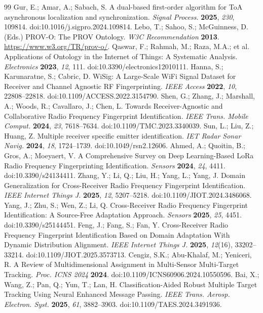 \begin{thebibliography}{99}
 Gur, E.; Amar, A.; Sabach, S. A dual-based first-order algorithm for ToA asynchronous localization and synchronization. \emph{Signal Process.} \textbf{2025}, \emph{230}, 109814. doi:10.1016/j.sigpro.2024.109814.
 Lebo, T.; Sahoo, S.; McGuinness, D. (Eds.) PROV-O: The PROV Ontology. \emph{W3C Recommendation} \textbf{2013}. \url{https://www.w3.org/TR/prov-o/}.
 Qaswar, F.; Rahmah, M.; Raza, M.A.; et al. Applications of Ontology in the Internet of Things: A Systematic Analysis. \emph{Electronics} \textbf{2023}, \emph{12}, 111. doi:10.3390/electronics12010111.
 Hanna, S.; Karunaratne, S.; Cabric, D. WiSig: A Large-Scale WiFi Signal Dataset for Receiver and Channel Agnostic RF Fingerprinting. \emph{IEEE Access} \textbf{2022}, \emph{10}, 22808--22818. doi:10.1109/ACCESS.2022.3154790.
 Shen, G.; Zhang, J.; Marshall, A.; Woods, R.; Cavallaro, J.; Chen, L. Towards Receiver-Agnostic and Collaborative Radio Frequency Fingerprint Identification. \emph{IEEE Trans. Mobile Comput.} \textbf{2024}, \emph{23}, 7618--7634. doi:10.1109/TMC.2023.3340039.
 Sun, L.; Liu, Z.; Huang, Z. Multiple receiver specific emitter identification. \emph{IET Radar Sonar Navig.} \textbf{2024}, \emph{18}, 1724--1739. doi:10.1049/rsn2.12606.
 Ahmed, A.; Quoitin, B.; Gros, A.; Moeyaert, V. A Comprehensive Survey on Deep Learning-Based LoRa Radio Frequency Fingerprinting Identification. \emph{Sensors} \textbf{2024}, \emph{24}, 4411. doi:10.3390/s24134411.
 Zhang, Y.; Li, Q.; Liu, H.; Yang, L.; Yang, J. Domain Generalization for Cross-Receiver Radio Frequency Fingerprint Identification. \emph{IEEE Internet Things J.} \textbf{2025}, \emph{12}, 5207--5218. doi:10.1109/JIOT.2024.3486068.
 Yang, J.; Zhu, S.; Wen, Z.; Li, Q. Cross-Receiver Radio Frequency Fingerprint Identification: A Source-Free Adaptation Approach. \emph{Sensors} \textbf{2025}, \emph{25}, 4451. doi:10.3390/s25144451.
 Feng, J.; Fang, S.; Fan, Y. Cross-Receiver Radio Frequency Fingerprint Identification Based on Domain Adaptation With Dynamic Distribution Alignment. \emph{IEEE Internet Things J.} \textbf{2025}, \emph{12}(16), 33202--33214. doi:10.1109/JIOT.2025.3573713.
 Cengiz, S.K.; Abu-Khalaf, M.; Yeniceri, R. A Review of Multidimensional Assignment in Multi-Sensor Multi-Target Tracking. \emph{Proc. ICNS 2024} \textbf{2024}. doi:10.1109/ICNS60906.2024.10550596.
 Bai, X.; Wang, Z.; Pan, Q.; Yun, T.; Lan, H. Classification-Aided Robust Multiple Target Tracking Using Neural Enhanced Message Passing. \emph{IEEE Trans. Aerosp. Electron. Syst.} \textbf{2025}, \emph{61}, 3882--3903. doi:10.1109/TAES.2024.3491936.

\end{thebibliography}
